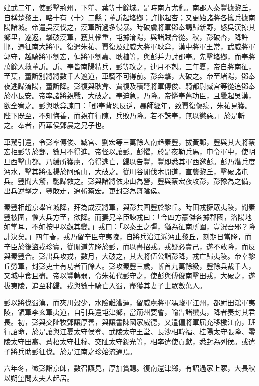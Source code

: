 \begin{pinyinscope}
建武二年，使彭擊荊州，下犨、葉等十餘城。是時南方尤亂。南郡人秦豐據黎丘，自稱楚黎王，略十有〈十〉二縣；董訢起堵鄉；許邯起杏；又更始諸將各擁兵據南陽諸城。帝遣吳漢伐之，漢軍所過多侵暴。時破虜將軍鄧奉謁歸新野，怒吳漢掠其鄉里，遂返，擊破漢軍，獲其輜重，屯據淯陽，與諸賊合從。秋，彭破杏，降許邯，遷征南大將軍。復遣朱祐、賈復及建威大將軍耿弇，漢中將軍王常，武威將軍郭守，越騎將軍劉宏，偏將軍劉嘉、耿植等，與彭并力討鄧奉。先擊堵鄉，而奉將萬餘人救董訢。訢、奉皆南陽精兵，彭等攻之，連月不剋。三年夏，帝自將南征，至葉，董訢別將將數千人遮道，車騎不可得前。彭奔擊，大破之。帝至堵陽，鄧奉夜逃歸淯陽，董訢降。彭復與耿弇、賈復及積弩將軍傅俊、騎都尉臧宮等從追鄧奉於小長安。帝率諸將親戰，大破之。奉迫急，乃降。帝憐奉舊功臣，且釁起吳漢，欲全宥之。彭與耿弇諫曰：「鄧奉背恩反逆，暴師經年，致賈復傷痍，朱祐見獲。陛下既至，不知悔善，而親在行陳，兵敗乃降。若不誅奉，無以懲惡。」於是斬之。奉者，西華侯鄧晨之兄子也。

車駕引還，令彭率傅俊、臧宮、劉宏等三萬餘人南趋秦豐，拔黃郵，豐與其大將蔡宏拒彭等於鄧，數月不得進。帝怪以讓彭。彭懼，於是夜勒兵馬，申令軍中，使明旦西擊山都。乃緩所獲虜，令得逃亡，歸以告豐，豐即悉其軍西邀彭。彭乃潛兵度沔水，擊其將張楊於阿頭山，大破之。從川谷閒伐木開道，直襲黎丘，擊破諸屯兵。豐聞大驚，馳歸救之。彭與諸將依東山為營，豐與蔡宏夜攻彭，彭豫為之備，出兵逆擊之，豐敗走，追斬蔡宏。更封彭為舞陰侯。

秦豐相趙京舉宜城降，拜為成漢將軍，與彭共圍豐於黎丘。時田戎擁眾夷陵，聞秦豐被圍，懼大兵方至，欲降。而妻兄辛臣諫戎曰：「今四方豪傑各據郡國，洛陽地如掌耳，不如按甲以觀其變。」戎曰：「以秦王之彊，猶為征南所圍，豈況吾邪？降計決矣。」四年春，戎乃留辛臣守夷陵，自將兵沿江泝沔止黎丘，刻期日當降，而辛臣於後盜戎珍寶，從閒道先降於彭，而以書招戎。戎疑必賣己，遂不敢降，而反與秦豐合。彭出兵攻戎，數月，大破之，其大將伍公詣彭降，戎亡歸夷陵。帝幸黎丘勞軍，封彭吏士有功者百餘人。彭攻秦豐三歲，斬首九萬餘級，豐餘兵裁千人，又城中食且盡。帝以豐轉弱，令朱祐代彭守之，使彭與傅俊南擊田戎，大破之，遂拔夷陵，追至秭歸。戎與數十騎亡入蜀，盡獲其妻子士眾數萬人。

彭以將伐蜀漢，而夾川穀少，水險難漕運，留威虜將軍馮駿軍江州，都尉田鴻軍夷陵，領軍李玄軍夷道，自引兵還屯津鄉，當荊州要會，喻告諸蠻夷，降者奏封其君長。初，彭與交阯牧鄧讓厚善，與讓書陳國家威德，又遣偏將軍屈充移檄江南，班行詔命，於是讓與江夏太守侯登、武陵太守王堂、長沙相韓福、桂陽太守張隆、零陵太守田翕、蒼梧太守杜穆、交阯太守錫光等，相率遣使貢獻，悉封為列侯。或遣子將兵助彭征伐。於是江南之珍始流通焉。

六年冬，徵彭詣京師，數召讌見，厚加賞賜。復南還津鄉，有詔過家上冢，大長秋以朔望問太夫人起居。


\end{pinyinscope}
